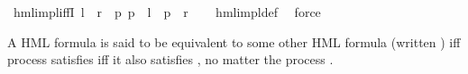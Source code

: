 \begin{isabellebody}
\isanewline
{}\isamarkupfalse%
\ hml{\isacharunderscore}{\kern0pt}impl{\isacharunderscore}{\kern0pt}iffI{\isacharcolon}{\kern0pt}\ {\isachardoublequoteopen}{\isasymphi}l\ {\isasymRrightarrow}\ {\isasymphi}r\ {\isacharequal}{\kern0pt}\ {\isacharparenleft}{\kern0pt}{\isasymforall}p{\isachardot}{\kern0pt}\ {\isacharparenleft}{\kern0pt}p\ {\isasymTurnstile}\ {\isasymphi}l{\isacharparenright}{\kern0pt}\ {\isasymlongrightarrow}\ {\isacharparenleft}{\kern0pt}p\ {\isasymTurnstile}\ {\isasymphi}r{\isacharparenright}{\kern0pt}{\isacharparenright}{\kern0pt}{\isachardoublequoteclose}\isanewline
%
\isadelimproof
\ \ %
\endisadelimproof
%
\isatagproof
{}\isamarkupfalse%
\ hml{\isacharunderscore}{\kern0pt}impl{\isacharunderscore}{\kern0pt}def\ \isamarkupfalse%
\ force%
\endisatagproof
{\isafoldproof}%
%
\isadelimproof
%
\endisadelimproof
%
\isadelimdocument
%
\endisadelimdocument
%
\isatagdocument
%
\isamarkuptrue%
%
\endisatagdocument
{\isafolddocument}%
%
\isadelimdocument
%
\endisadelimdocument
%
\begin{isamarkuptext}%
A HML formula  is said to be equivalent to some other HML formula  (written )
iff process  satisfies  iff it also satisfies , no matter the process .


\end{isamarkuptext}
\end{isabellebody}
